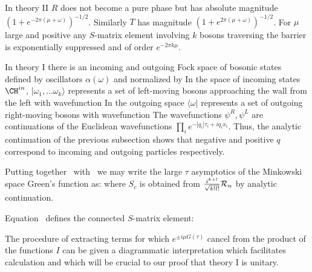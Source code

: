 In theory II $R$ does not become a pure phase but has absolute
magnitude $(1+e^{-2\pi(\mu+\omega)})^{-1/2}$. Similarly $T$
has magnitude $(1+e^{2\pi(
\mu+\omega)})^{-1/2}$. For $\mu$
large and positive any
$S$-matrix element involving $k$ bosons traversing the barrier
is exponentially suppressed and of order $e^{-2\pi k \mu}$.
 
 
In theory I
there is an incoming and outgoing Fock space of bosonic states
defined by oscillators $\alpha(\omega)$ and normalized by
\eqn{}
In the space of incoming states $\CH^{in}$, $|\omega_1,...\omega_k\rangle$
represents
a set of left-moving bosons approaching the wall from the left with
wavefunction
\eqn{}
In the outgoing space
$\langle \omega|$ represents a set of outgoing right-moving bosons with
wavefunction
\eqn{}
The wavefunctions $\psi^R,\psi^L$ are continuations of the 
Euclidean wavefunctions $\prod_i e^{-|q_i|\tau_i + i q_i x_i}$. Thus, 
the analytic continuation of the previous subsection shows
that negative and positive $q$ correspond to incoming and 
outgoing particles respectively.
 
Putting together \ with \incmr\outgl\ we may write
the large $\tau$ asymptotics of the Minkowski space
Green's function as: 
\eqn{}
where $S_c$ is obtained from 
${i^{k+l} \over \sqrt{k! l!}} {\cal R}_n$ by analytic continuation.
 
Equation \minkgf\ defines the connected $S$-matrix element:
\eqn{}
 
 
 
The procedure of extracting terms for which $e^{\pm i \mu G(\tau)}$
cancel from the product of the functions
$I$ can be given a diagrammatic interpretation which facilitates
calculation and which will be crucial to our proof that theory I
is unitary.%
 
